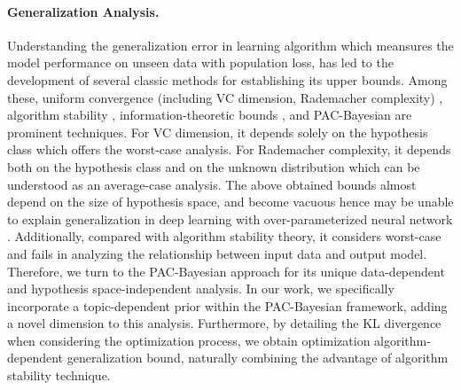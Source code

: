 \paragraph{Generalization Analysis.} Understanding the generalization error in learning algorithm which meansures the model performance on unseen data with population loss, has led to the development of several classic methods for establishing its upper bounds. Among these, uniform convergence (including VC dimension, Rademacher complexity) \citep{bartlett2017spectrally, shalev2010learnability, vapnik1994measuring}, algorithm stability \citep{bousquet2002stability, feldman2018generalization, hardt2016train, lei2020fine, zhang2022stability}, information-theoretic bounds \citep{russo2016controlling, russo2019much, xu2017information}, and PAC-Bayesian \citep{catoni2007pac,dziugaite2017computing, mcallester1998some} are prominent techniques. 
For VC dimension, it depends solely on the hypothesis class which offers the worst-case analysis. For Rademacher complexity, it depends both on the hypothesis class and on the unknown distribution which can be understood as an average-case analysis. The above obtained bounds almost depend on the size of hypothesis space, and become vacuous hence may be unable to explain generalization in deep learning with over-parameterized neural network \citep{nagarajan2019uniform, zhang2021understanding}. Additionally, compared with algorithm stability theory, it considers worst-case and fails in analyzing the relationship between input data and output model. Therefore, we turn to the PAC-Bayesian approach for its unique data-dependent and hypothesis space-independent analysis. In our work, we specifically incorporate a topic-dependent prior within the PAC-Bayesian framework, adding a novel dimension to this analysis. Furthermore, by detailing the KL divergence when considering the optimization process, we obtain optimization algorithm-dependent generalization bound, naturally combining the advantage of algorithm stability technique. 